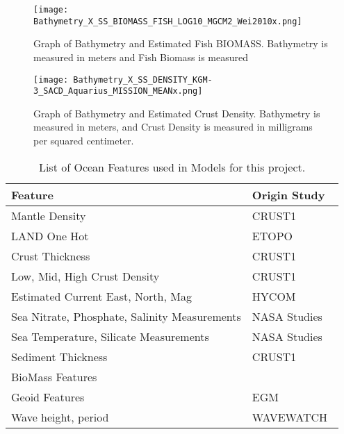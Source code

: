 \begin{figure}[htp]
    \centering
    \texttt{[image: Bathymetry\_X\_SS\_BIOMASS\_FISH\_LOG10\_MGCM2\_Wei2010x.png]}
    \caption[Graph of Bathymetry and Fish Biomass]{Graph of Bathymetry and Estimated Fish BIOMASS. Bathymetry is measured in meters and Fish Biomass is measured }
    \label{fig:bathyxfish}
\end{figure}

\begin{figure}[htp]
    \centering
    \texttt{[image: Bathymetry\_X\_SS\_DENSITY\_KGM-3\_SACD\_Aquarius\_MISSION\_MEANx.png]}
    \caption[Graph of Bathymetry and Crust Density]{Graph of Bathymetry and Estimated Crust Density.
    Bathymetry is measured in meters, and Crust Density is measured in milligrams per squared centimeter.}
    \label{fig:bathyxdensity}
\end{figure}

%

\newpage

\begin{table}[htp]
    \centering
    \caption{List of Ocean Features used in Models for this project.}
    \begin{tabular}{ |p{} p{}| }
        \hline
            \textbf{Feature} & \textbf{Origin Study} \\
            \hline
            Mantle Density & CRUST1~\cite{laske2013update} \\
            LAND One Hot & ETOPO~\cite{national1988etopo} \\
            Crust Thickness & CRUST1~\cite{laske2013update} \\
            Low, Mid, High Crust Density & CRUST1~\cite{laske2013update} \\
            Estimated Current East, North, Mag & HYCOM~\cite{chassignet2009us} \\
            Sea Nitrate, Phosphate, Salinity Measurements & NASA Studies~\cite{meissner2018salinity,parekh2005decoupling}  \\
            Sea Temperature, Silicate Measurements & NASA Studies \\
            Sediment Thickness & CRUST1~\cite{laske2013update} \\
            BioMass Features &~\cite{wei2010global} \\
            Geoid Features & EGM~\cite{pavlis2008earth} \\
            Wave height, period & WAVEWATCH~\cite{tolman20072007} \\
        \hline
    \end{tabular}
    \label{table:FEATURE_LIST}
\end{table}
